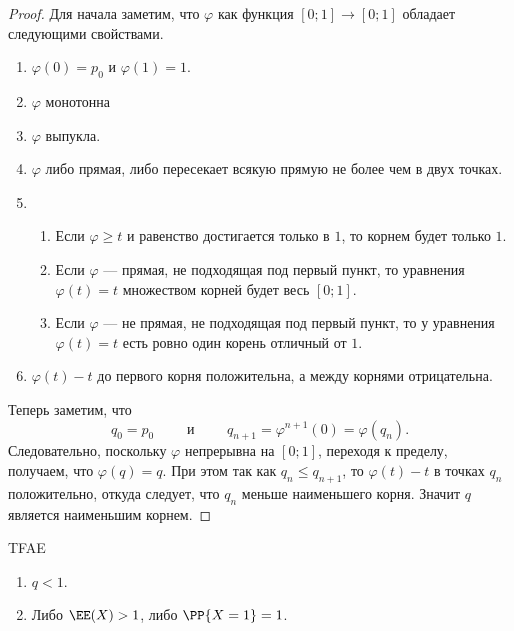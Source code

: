 \documentclass[12pt,a4paper]{article}
\begin{document}
    \begin{proof}
        Для начала заметим, что $\varphi$ как функция $[0; 1] \to [0; 1]$ обладает следующими свойствами.
        \begin{enumerate}
            \item $\varphi(0) = p_0$ и $\varphi(1) = 1$.
            \item $\varphi$ монотонна
            \item $\varphi$ выпукла.
            \item $\varphi$ либо прямая, либо пересекает всякую прямую не более чем в двух точках.
            \item\ 
                \begin{enumerate}
                    \item Если $\varphi \geqslant t$ и равенство достигается только в $1$, то корнем будет только $1$.
                    \item Если $\varphi$ --- прямая, не подходящая под первый пункт, то уравнения $\varphi(t) = t$ множеством корней будет весь $[0; 1]$.
                    \item Если $\varphi$ --- не прямая, не подходящая под первый пункт, то у уравнения $\varphi(t) = t$ есть ровно один корень отличный от $1$.
                \end{enumerate}
            \item $\varphi(t) - t$ до первого корня положительна, а между корнями отрицательна.
        \end{enumerate}

        Теперь заметим, что
        \[q_0 = p_0 \qquad \text{ и } \qquad q_{n+1} = \varphi^{n+1}(0) = \varphi(q_n).\]
        Следовательно, поскольку $\varphi$ непрерывна на $[0; 1]$, переходя к пределу, получаем, что $\varphi(q) = q$. При этом так как $q_n \leqslant q_{n+1}$, то $\varphi(t) - t$ в точках $q_n$ положительно, откуда следует, что $q_n$ меньше наименьшего корня. Значит $q$ является наименьшим корнем.
    \end{proof}

    \begin{theorem}
        TFAE
        \begin{enumerate}
            \item $q < 1$.
            \item Либо $\EE(X) > 1$, либо $\PP\{X = 1\} = 1$.
        \end{enumerate}
    \end{theorem}
\end{document}
